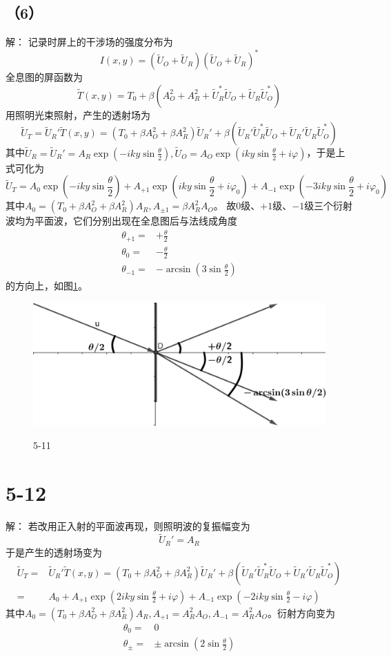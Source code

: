 \documentclass[10pt,a4paper]{article}
\begin{document}
\subsection*{（6）}解：
记录时屏上的干涉场的强度分布为
\[
I(x,y)=(\widetilde{U}_O+\widetilde{U}_R)(\widetilde{U}_O+\widetilde{U}_R)^*
\]
全息图的屏函数为
\[
\widetilde{T}(x,y)=T_0+\beta(A_O^2+A_R^2+\widetilde{U}_R^*\widetilde{U}_O+\widetilde{U}_R\widetilde{U}_O^*)
\]
用照明光束照射，产生的透射场为
\[
\widetilde{U}_T=\widetilde{U}_R'\widetilde{T}(x,y)=(T_0+\beta A_O^2+\beta A_R^2)\widetilde{U}_R'+\beta(\widetilde{U}_R'\widetilde{U}_R^*\widetilde{U}_O+\widetilde{U}_R'\widetilde{U}_R\widetilde{U}_O^*)
\]
其中$\widetilde{U}_R=\widetilde{U}_R'=A_R\exp(-iky\sin\frac{\theta}{2}), \widetilde{U}_O=A_O\exp(iky\sin\frac{\theta}{2}+i\varphi)$，于是上式可化为
\[
\widetilde{U}_T=A_0\exp(-iky\sin\frac{\theta}{2})+A_{+1}\exp(iky\sin\frac{\theta}{2}+i\varphi_0)+A_{-1}\exp(-3iky\sin\frac{\theta}{2}+i\varphi_0)
\]
其中$A_0=(T_0+\beta A_O^2+\beta A_R^2)A_R, A_{\pm1}=\beta A_R^2A_O$。 故$0$级、$+1$级、$-1$级三个衍射波均为平面波，它们分别出现在全息图后与法线成角度
\begin{align*}
\theta_{+1}=&+\frac{\theta}{2}\\
\theta_0=&-\frac{\theta}{2}\\
\theta_{-1}=&-\arcsin(3\sin\frac{\theta}{2})
\end{align*}
的方向上，如图\ref{OpticsHomework_7_5-11}。
\begin{figure}[h]
\centering
\includegraphics[scale=.2]{OpticsHomework_7_5-11.png}\\
\caption{5-11}\label{OpticsHomework_7_5-11}
\end{figure}
\section*{5-12}解：
若改用正入射的平面波再现，则照明波的复振幅变为
\[
\widetilde{U}_R'=A_R
\]
于是产生的透射场变为
\begin{align*}
\widetilde{U}_T=&\widetilde{U}_R'\widetilde{T}(x,y)=(T_0+\beta A_O^2+\beta A_R^2)\widetilde{U}_R'+\beta(\widetilde{U}_R'\widetilde{U}_R^*\widetilde{U}_O+\widetilde{U}_R'\widetilde{U}_R\widetilde{U}_O^*)\\
=&A_0+A_{+1}\exp(2iky\sin\frac{\theta}{2}+i\varphi)+A_{-1}\exp(-2iky\sin\frac{\theta}{2}-i\varphi)
\end{align*}
其中$A_0=(T_0+\beta A_O^2+\beta A_R^2)A_R, A_{+1}=A_R^2A_O, A_{-1}=A_R^2A_O$。衍射方向变为
\begin{align*}
\theta_0=&0\\
\theta_{\pm}=&\pm\arcsin(2\sin\frac{\theta}{2})
\end{align*}
\end{document}
